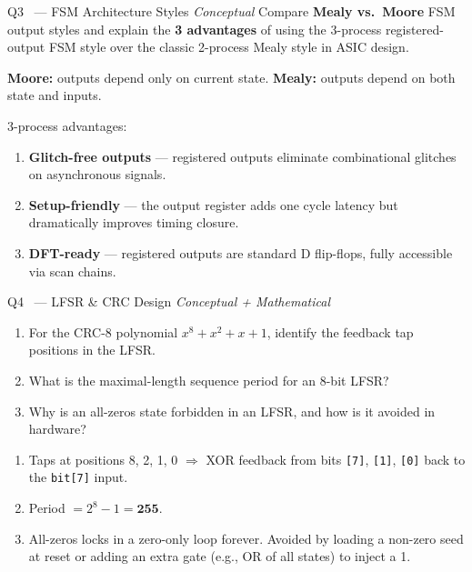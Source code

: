 \documentclass[12pt,a4paper]{article}
\newcommand{\advanced}{%
  \fbox{\textcolor{advred}{\bfseries\sffamily\small ADVANCED}}}
\newcommand{\moderate}{%
  \fbox{\textcolor{modoran}{\bfseries\sffamily\small MODERATE}}}
\begin{document}
\begin{questionbox}{Q3 \moderate\ --- FSM Architecture Styles \hfill\textit{Conceptual}}
Compare \textbf{Mealy vs.\ Moore} FSM output styles and explain the \textbf{3 advantages} of using the 3-process registered-output FSM style over the classic 2-process Mealy style in ASIC design.
\end{questionbox}

\begin{answerbox}
\textbf{Moore:} outputs depend only on current state.
\textbf{Mealy:} outputs depend on both state and inputs.

3-process advantages:
\begin{enumerate}
  \item \textbf{Glitch-free outputs} --- registered outputs eliminate combinational glitches on asynchronous signals.
  \item \textbf{Setup-friendly} --- the output register adds one cycle latency but dramatically improves timing closure.
  \item \textbf{DFT-ready} --- registered outputs are standard D flip-flops, fully accessible via scan chains.
\end{enumerate}
\end{answerbox}

\begin{questionbox}{Q4 \advanced\ --- LFSR \& CRC Design \hfill\textit{Conceptual + Mathematical}}
\begin{enumerate}[label=\textbf{\alph*)}]
  \item For the CRC-8 polynomial $x^8 + x^2 + x + 1$, identify the feedback tap positions in the LFSR.
  \item What is the maximal-length sequence period for an 8-bit LFSR?
  \item Why is an all-zeros state forbidden in an LFSR, and how is it avoided in hardware?
\end{enumerate}
\end{questionbox}

\begin{answerbox}
\begin{enumerate}[label=\textbf{\alph*)}]
  \item Taps at positions 8, 2, 1, 0 $\Rightarrow$ XOR feedback from bits \texttt{[7]}, \texttt{[1]}, \texttt{[0]} back to the \texttt{bit[7]} input.
  \item Period $= 2^8 - 1 = \mathbf{255}$.
  \item All-zeros locks in a zero-only loop forever. Avoided by loading a non-zero seed at reset or adding an extra gate (e.g., OR of all states) to inject a 1.
\end{enumerate}
\end{answerbox}
\end{document}
